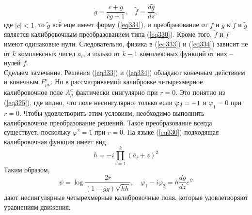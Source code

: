 \documentclass[12pt]{article}
\theoremstyle{definition}
\begin{document}
\begin{equation}
    \tilde{g}=\frac{c+g}{\bar{c}g+1},\quad\tilde{f}=\frac{d\tilde{g}}{dz},
\end{equation}
где $|c|< 1$, то $\tilde{g}$ всё еще имеет форму (\ref{eq334}), и преобразование от $f$ и $g$ к $\tilde{f}$ и $\tilde{g}$ является калибровочным преобразованием типа (\ref{eq330}). Кроме того, $\tilde{f}$ и $f$ имеют одинаковые нули. Следовательно, физика в (\ref{eq333}) и (\ref{eq334}) зависит не от $k$ комплексных чисел $a_i$, а только от $k - 1$ комплексных функций от них -- нулей $f$.\\
Сделаем замечание. Решения (\ref{eq333}) и (\ref{eq334}) обладают конечным действием и конечным $F^a_{\mu\nu}$. Но в рассматриваемой калибровке четырехмерное калибровочное поле $A_\mu^a$ фактически сингулярно при $r = 0$. Это понятно из (\ref{eq325}), где видно, что поле несингулярно, только если $\varphi_2=\textcolor{red}{-}1$ и $\varphi_1=0$ при $r = 0$. Чтобы удовлетворить этим условиям, необходимо выполнить калибровочное преобразование решений. Такое преобразование всегда существует, поскольку $\varphi^2=1$ при $r = 0$. На языке (\ref{eq330}) подходящая калибровочная функция имеет вид
\begin{equation}
    h=-i\prod\limits_{i=1}^k(\bar{a}_i+z)^2
\end{equation}
Таким образом,
\begin{equation}
    \psi=\log\frac{2r}{(1-\bar{g}g)\sqrt{\bar{h}h}},\quad\varphi_1-i\varphi_2=h\frac{dg}{dz}e^\psi
\end{equation}
дают несингулярные четырехмерные калибровочные поля, которые удовлетворяют уравнениям движения.
\end{document}

